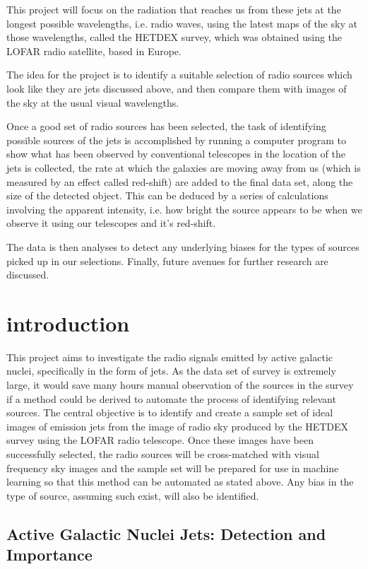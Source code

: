\documentclass{article}
\begin{document}
This project will focus on the radiation that reaches us from these jets at the longest possible wavelengths, i.e. radio waves, using the latest maps of the sky at those wavelengths, called the HETDEX survey, which was obtained using the LOFAR radio satellite, based in Europe.

The idea for the project is to identify a suitable selection of radio sources which look like they are jets discussed above, and then compare them with images of the sky at the usual visual wavelengths.

Once a good set of radio sources has been selected, the task of identifying possible sources of the jets is accomplished by running a computer program to show what has been observed by conventional telescopes in the location of the jets is collected, the rate at which the galaxies are moving away from us (which is measured by an effect called red-shift) are added to the final data set, along the size of the detected object. This can be deduced by a series of calculations involving the apparent intensity, i.e. how bright the source appears to be when we observe it using our telescopes and it's red-shift.

The data is then analyses to detect any underlying biases for the types of sources picked up in our selections. Finally, future avenues for further research are discussed.
\newpage

\section{introduction}
This project aims to investigate the radio signals emitted by active galactic nuclei, specifically in the form of jets. As the data set of survey is extremely large, it would save many hours manual observation of the sources in the survey if a method could be derived to automate the process of identifying relevant sources. The central objective is to identify and create a sample set of ideal images of emission jets from the image of radio sky produced by the HETDEX survey using the LOFAR radio telescope. Once these images have been successfully selected, the radio sources will be cross-matched with visual frequency sky images and the sample set will be prepared for use in machine learning so that this method can be automated as stated above. Any bias in the type of source, assuming such exist, will also be identified.


\subsection{Active Galactic Nuclei Jets: Detection and Importance} 
\end{document}
